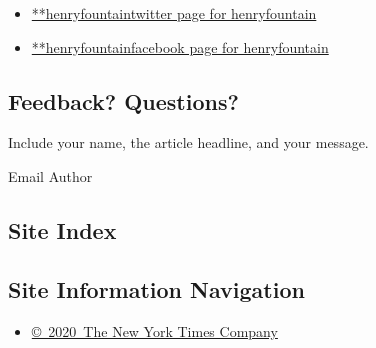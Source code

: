 \begin{itemize}
\tightlist
\item
  \href{https://twitter.com/henryfountain}{**henryfountaintwitter page
  for henryfountain}
\item
  \href{https://www.facebookcorewwwi.onion/henryfountain}{**henryfountainfacebook
  page for henryfountain}
\end{itemize}

\hypertarget{feedback-questions}{%
\subsection{Feedback? Questions?}\label{feedback-questions}}

Include your name, the article headline, and your message.

Email Author

\hypertarget{site-index}{%
\subsection{Site Index}\label{site-index}}

\hypertarget{site-information-navigation}{%
\subsection{Site Information
Navigation}\label{site-information-navigation}}

\begin{itemize}
\tightlist
\item
  \href{https://help.nytimes3xbfgragh.onion/hc/en-us/articles/115014792127-Copyright-notice}{©~2020~The
  New York Times Company}
\end{itemize}


